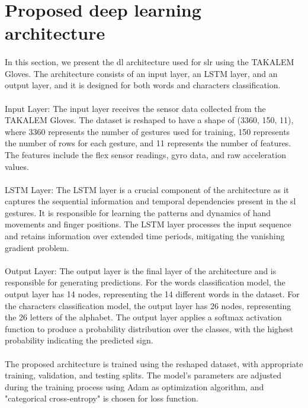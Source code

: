 \section{Proposed deep learning architecture}
\paragraph{}
In this section, we present the \ac{dl} architecture used for \ac{slr} using the TAKALEM Gloves. The architecture consists of an input layer, an LSTM layer, and an output layer, and it is designed for both words and characters classification.
\paragraph{}
Input Layer: The input layer receives the sensor data collected from the TAKALEM Gloves. The dataset is reshaped to have a shape of (3360, 150, 11), where 3360 represents the number of gestures used for training, 150 represents the number of rows for each gesture, and 11 represents the number of features. The features include the flex sensor readings, gyro data, and raw acceleration values.
\paragraph{}
LSTM Layer: The LSTM layer is a crucial component of the architecture as it captures the sequential information and temporal dependencies present in the \ac{sl} gestures. It is responsible for learning the patterns and dynamics of hand movements and finger positions. The LSTM layer processes the input sequence and retains information over extended time periods, mitigating the vanishing gradient problem.
\paragraph{}
Output Layer: The output layer is the final layer of the architecture and is responsible for generating predictions. For the words classification model, the output layer has 14 nodes, representing the 14 different words in the dataset. For the characters classification model, the output layer has 26 nodes, representing the 26 letters of the alphabet. The output layer applies a softmax activation function to produce a probability distribution over the classes, with the highest probability indicating the predicted sign.
\paragraph{}
The proposed architecture is trained using the reshaped dataset, with appropriate training, validation, and testing splits. The model's parameters are adjusted during the training process using Adam as optimization algorithm, and "categorical cross-entropy" is chosen for loss function.
